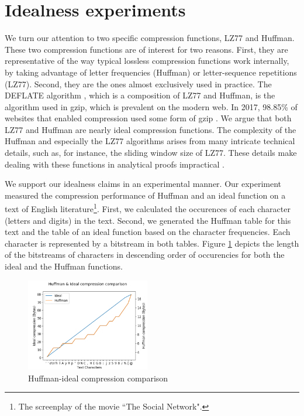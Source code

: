 \section{Idealness experiments}\label{subsec:idealness_experiment}

We turn our attention to two specific compression functions, LZ77 and Huffman.
These two compression functions are of interest for two reasons. First, they are
representative of the way typical lossless compression functions work
internally, by taking advantage of letter frequencies (Huffman) or
letter-sequence repetitions (LZ77). Second, they are the ones almost exclusively
used in practice. The DEFLATE algorithm \cite{deutsch1996deflate}, which is a
composition of LZ77 and Huffman, is the algorithm used in gzip, which is
prevalent on the modern web. In 2017, 98.85\% of websites that enabled
compression used some form of gzip \cite{gzipusage}. We argue that both LZ77 and
Huffman are nearly ideal compression functions. The complexity of the Huffman
and especially the LZ77 algorithms arises from many intricate technical details,
such as, for instance, the sliding window size of LZ77. These details make
dealing with these functions in analytical proofs impractical .

We support our idealness claims in an experimental manner. Our experiment
measured the compression performance of Huffman and an ideal function on a
text of English literature\footnote{The screenplay of the movie ``The Social
Network".}. First, we calculated the occurences of each character (letters and
digits) in the text. Second, we generated the Huffman
table for this text and the table of an ideal function based on the character
frequencies. Each character is represented by a bitstream in both tables. Figure
\ref{fig:huffman_idealness} depicts the length of the bitstreams of characters
in descending order of occurencies for both the ideal and the Huffman functions.

    \begin{figure}[thpb]
        \centering
            \includegraphics[width=0.48\textwidth]{experiments/huffman_idealness/huffman_idealness.png}
        \caption{Huffman-ideal compression comparison}
        \label{fig:huffman_idealness}
    \end{figure}

